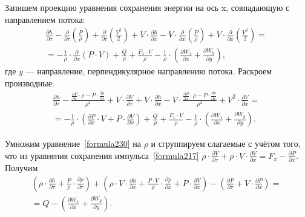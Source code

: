Запишем проекцию уравнения сохранения энергии на ось x, совпадающую с направлением потока:
\begin{eqnarray}
\label{formula229}
\frac{\partial h}{\partial\tau} - \frac{\partial}{\partial\tau}\left(\frac P \rho\right)+\frac{\partial}{\partial\tau}\left(\frac{V^2}{2} \right) + V \cdot \frac{\partial h}{\partial x} - V \cdot \frac{\partial}{\partial x}\left(\frac P \rho  \right) + V \cdot \frac{\partial}{\partial x}\left(\frac{V^2}{2} \right) = \nonumber ~\\
= -\frac 1 \rho\cdot\frac{\partial}{\partial x}(P \cdot V) + \frac Q \rho + \frac{F_x\cdot V}{\rho} -\frac 1 \rho\cdot \left(\frac{\partial W_x}{\partial x} + \frac{\partial W_y}{\partial y}\right),
\end{eqnarray} 
где $y$ --- направление, перпендикулярное направлению потока. Раскроем производные:
\begin{eqnarray}
\label{formula230}
\frac{\partial h}{\partial\tau} - \frac{\frac{\partial P}{\partial\tau} \cdot\rho - P \cdot\frac{\partial\rho}{\partial\tau} }{\rho^2} + V \cdot\frac{\partial V}{\partial\tau} + V \cdot \frac{\partial h}{\partial x} - V \cdot \frac{\frac{\partial P}{\partial x} \cdot\rho - P \cdot\frac{\partial\rho}{\partial x} }{\rho^2} + V^2 \cdot\frac{\partial V}{\partial x} = \nonumber ~\\
= -\frac 1 \rho\cdot \left(\frac{\partial P}{\partial x}\cdot V + P \cdot \frac{\partial V}{\partial x}  \right) + \frac Q \rho + \frac{F_x\cdot V}{\rho} -\frac 1 \rho\cdot \left(\frac{\partial W_x}{\partial x} + \frac{\partial W_y}{\partial y}\right).
\end{eqnarray}

Умножим уравнение~\eqref{formula230} на $\rho$ и сгруппируем слагаемые с учётом того, что из уравнения сохранения импульса~\eqref{formula217} $\rho\cdot\frac{\partial V}{\partial\tau}+\rho\cdot V \cdot \frac{\partial V}{\partial x} = F_x - \frac{\partial P}{\partial x}$. Получим   
\begin{eqnarray}
\label{formula231}
\left(\rho\cdot\frac{\partial h}{\partial\tau}+\frac{P}{\rho}\cdot\frac{\partial\rho}{\partial\tau}   \right)+\left(\rho\cdot V \cdot\frac{\partial h}{\partial x}+\frac{P\cdot V}{\rho}\cdot\frac{\partial\rho}{\partial x}+P \cdot\frac{\partial V}{\partial x} \right) - \left(\frac{\partial P}{\partial\tau}+V\cdot\frac{\partial P}{\partial x}  \right) = \nonumber ~\\
= Q - \left(\frac{\partial W_x}{\partial x} + \frac{\partial W_y}{\partial y} \right).
\end{eqnarray}

